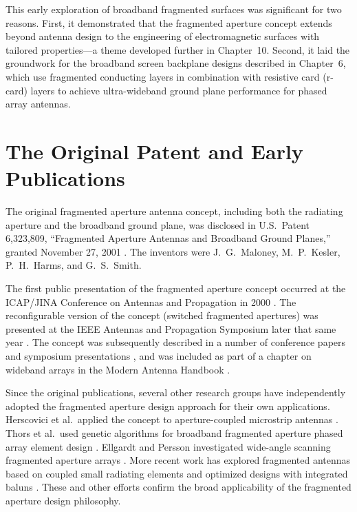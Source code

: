 This early exploration of broadband fragmented surfaces was significant for two reasons.  First, it demonstrated that the fragmented aperture concept extends beyond antenna design to the engineering of electromagnetic surfaces with tailored properties---a theme developed further in Chapter~10.  Second, it laid the groundwork for the broadband screen backplane designs described in Chapter~6, which use fragmented conducting layers in combination with resistive card (r-card) layers to achieve ultra-wideband ground plane performance for phased array antennas.

\section{The Original Patent and Early Publications}

The original fragmented aperture antenna concept, including both the radiating aperture and the broadband ground plane, was disclosed in U.S.\ Patent 6,323,809, ``Fragmented Aperture Antennas and Broadband Ground Planes,'' granted November 27, 2001 \cite{MaloneyFragPatent}.  The inventors were J.~G.~Maloney, M.~P.~Kesler, P.~H.~Harms, and G.~S.~Smith.

The first public presentation of the fragmented aperture concept occurred at the ICAP/JINA Conference on Antennas and Propagation in 2000 \cite{MaloneyKeslerHarms}.  The reconfigurable version of the concept (switched fragmented apertures) was presented at the IEEE Antennas and Propagation Symposium later that same year \cite{MaloneyKeslerLust}.  The concept was subsequently described in a number of conference papers and symposium presentations \cite{FriederichPringle}, and was included as part of a chapter on wideband arrays in the Modern Antenna Handbook \cite{BalanisHB12}.

Since the original publications, several other research groups have independently adopted the fragmented aperture design approach for their own applications.  Herscovici et al.\ applied the concept to aperture-coupled microstrip antennas \cite{Herscovici}.  Thors et al.\ used genetic algorithms for broadband fragmented aperture phased array element design \cite{Thors2005Broad-band}.  Ellgardt and Persson investigated wide-angle scanning fragmented aperture arrays \cite{Ellgardt2006Characteristics}.  More recent work has explored fragmented antennas based on coupled small radiating elements \cite{Barani2018Fragmented} and optimized designs with integrated baluns \cite{Zang2019Optimum}.  These and other efforts confirm the broad applicability of the fragmented aperture design philosophy.

